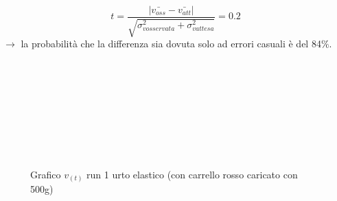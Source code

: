\documentclass[a4paper]{article}
\theoremstyle{definition}
\begin{document}
\[t = \frac{ \left |\bar{v_{oss}}  - \bar{v_{att}} \right |}{\sqrt{\sigma_{vosservata}^{2}+ \sigma_{vattesa}^{2}}} = 0.2 \]
\noindent \(\rightarrow\) la probabilità che la differenza sia dovuta solo ad errori casuali è del 84\(\%\).\\\\\\\\\\\\\\\\\\
\begin{figure}[!ht]
	\captionsetup{labelformat=empty}
	\caption{Grafico \(v_{(t)}\) run 1 urto elastico (con carrello rosso caricato con 500g)}
	
\end{figure}
\end{document}
